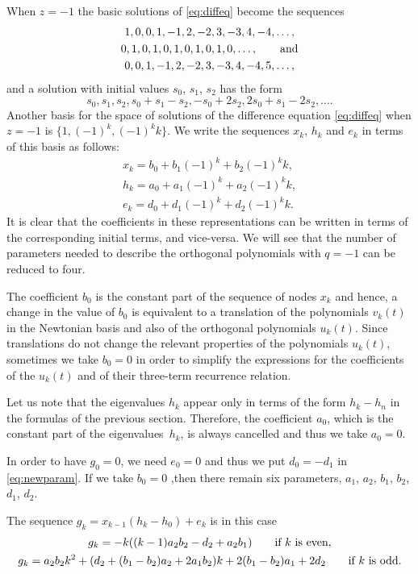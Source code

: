 \documentclass[10pt,a4paper]{amsart}
\numberwithin{equation}{section}
\begin{document}
When $z=-1$ the basic solutions of \eqref{eq:diffeq} become the sequences
\begin{gather*}
1,0,0,1,-1,2,-2,3,-3,4,-4,\dots, \\
0,1,0,1,0,1,0,1,0,1,0, \dots, \qquad \hbox{and} \\
0,0,1,-1,2,-2,3, -3, 4,-4,5, \dots,
\end{gather*}
and a solution with initial values $s_0$, $s_1$, $s_2$ has the form
\[
s_0, s_1, s_2, s_0+s_1-s_2, -s_0+2 s_2, 2 s_0 + s_1 - 2 s_2, \dots.
\]
Another basis for the space of solutions of the difference equation \eqref{eq:diffeq} when $z=-1$ is $\bigl\{ 1, (-1)^k, (-1)^k k\bigr\}$. We write the sequences $x_k$, $h_k$ and $e_k$ in terms of this basis as follows:
\begin{gather}
 x_k = b_0 + b_1 (-1)^k + b_2 (-1)^k k, \\
 h_k = a_0 + a_1 (-1)^k + a_2 (-1)^k k, \\
 e_k = d_0+ d_1 (-1)^k + d_2 (-1)^k k. \label{eq:newparam}
\end{gather}
It is clear that the coefficients in these representations can be written in terms of the corresponding initial terms, and vice-versa.
We will see that the number of parameters needed to describe the orthogonal polynomials with $q=-1$ can be reduced to four.

The coefficient $b_0$ is the constant part of the sequence of nodes $x_k$ and hence, a change in the value of $b_0$ is equivalent to a translation of the polynomials $v_k(t)$ in the Newtonian basis and also of the orthogonal polynomials $u_k(t)$. Since translations do not change the relevant properties of the polynomials $u_k(t)$, sometimes we take $b_0=0$ in order to simplify the expressions for the coefficients of the $u_k(t)$ and of their three-term recurrence relation.

Let us note that the eigenvalues $h_k$ appear only in terms of the form $h_k-h_n$ in the formulas of the previous section. Therefore,
the coefficient $a_0$, which is the constant part of the eigenvalues~$h_k$, is always cancelled and thus we take $a_0=0$.

In order to have $g_0=0$, we need $e_0=0$ and thus we put $d_0= -d_1$ in \eqref{eq:newparam}.
If we take $b_0=0$ ,then there remain six parameters, $a_1$, $a_2$, $b_1$, $b_2$, $d_1$, $d_2$.

The sequence $g_k=x_{k-1}(h_k - h_0)+ e_k$ is in this case
\begin{gather*}%
	g_k= -k ( (k-1)a_2 b_2 -d_2+ a_2 b_1) \qquad \hbox{if $k$ is even},\\
	g_k= a_2 b_2 k^2 + (d_2+ (b_1-b_2) a_2 + 2 a_1 b_2) k +2 ( b_1- b_2) a_1 + 2 d_2\qquad \hbox{if $k$ is odd}.
\end{gather*}
\end{document}

